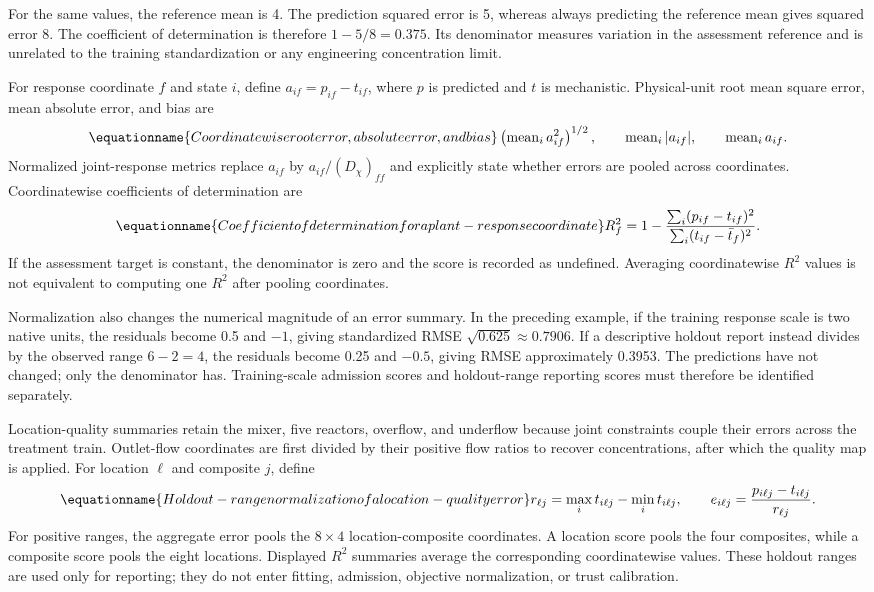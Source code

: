 For the same values, the reference mean is 4. The prediction squared error is 5, whereas always predicting the reference mean gives squared error 8. The coefficient of determination is therefore $1-5/8=0.375$. Its denominator measures variation in the assessment reference and is unrelated to the training standardization or any engineering concentration limit.

For response coordinate $f$ and state $i$, define $a_{if}=p_{if}-t_{if}$, where $p$ is predicted and $t$ is mechanistic. Physical-unit root mean square error, mean absolute error, and bias are
\begin{equation}
\equationname{Coordinatewise root error, absolute error, and bias}
\left(\operatorname{mean}_i a_{if}^2\right)^{1/2},\qquad
\operatorname{mean}_i|a_{if}|,\qquad
\operatorname{mean}_i a_{if}.
\end{equation}
Normalized joint-response metrics replace $a_{if}$ by $a_{if}/(D_\chi)_{ff}$ and explicitly state whether errors are pooled across coordinates. Coordinatewise coefficients of determination are
\begin{equation}
\equationname{Coefficient of determination for a plant-response coordinate}
R_f^2=1-\frac{\sum_i(p_{if}-t_{if})^2}{\sum_i(t_{if}-\bar t_f)^2}.
\end{equation}
If the assessment target is constant, the denominator is zero and the score is recorded as undefined. Averaging coordinatewise $R^2$ values is not equivalent to computing one $R^2$ after pooling coordinates.

Normalization also changes the numerical magnitude of an error summary. In the preceding example, if the training response scale is two native units, the residuals become 0.5 and $-1$, giving standardized RMSE $\sqrt{0.625}\approx0.7906$. If a descriptive holdout report instead divides by the observed range $6-2=4$, the residuals become 0.25 and $-0.5$, giving RMSE approximately 0.3953. The predictions have not changed; only the denominator has. Training-scale admission scores and holdout-range reporting scores must therefore be identified separately.

Location-quality summaries retain the mixer, five reactors, overflow, and underflow because joint constraints couple their errors across the treatment train. Outlet-flow coordinates are first divided by their positive flow ratios to recover concentrations, after which the quality map is applied. For location $\ell$ and composite $j$, define
\begin{equation}
\equationname{Holdout-range normalization of a location-quality error}
r_{\ell j}=\max_it_{i\ell j}-\min_it_{i\ell j},\qquad
e_{i\ell j}=\frac{p_{i\ell j}-t_{i\ell j}}{r_{\ell j}}.
\end{equation}
For positive ranges, the aggregate error pools the $8\times4$ location-composite coordinates. A location score pools the four composites, while a composite score pools the eight locations. Displayed $R^2$ summaries average the corresponding coordinatewise values. These holdout ranges are used only for reporting; they do not enter fitting, admission, objective normalization, or trust calibration.

